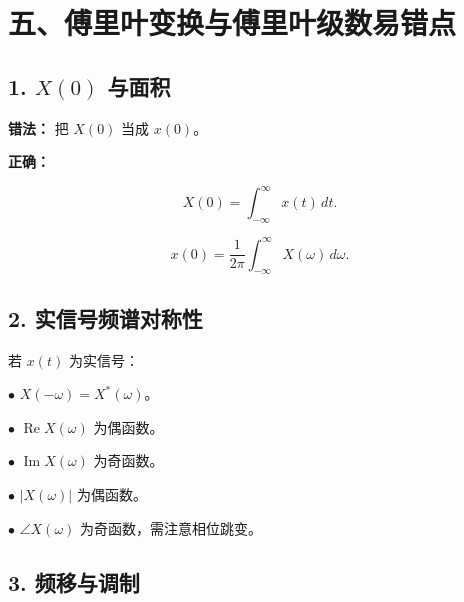 \documentclass[11pt]{ctexart}
\begin{document}
\section*{五、傅里叶变换与傅里叶级数易错点}



\subsection*{1. \(X(0)\) 与面积}



\textbf{错法：} 把 \(X(0)\) 当成 \(x(0)\)。\par



\textbf{正确：}\par

\[

X(0)=\int_{-\infty}^{\infty}x(t)\,dt.

\]

\[

x(0)=\frac{1}{2\pi}\int_{-\infty}^{\infty}X(\omega)\,d\omega.

\]



\subsection*{2. 实信号频谱对称性}



若 \(x(t)\) 为实信号：\par



\noindent\(\bullet\) \(X(-\omega)=X^*(\omega)\)。\par

\noindent\(\bullet\) \(\operatorname{Re}X(\omega)\) 为偶函数。\par

\noindent\(\bullet\) \(\operatorname{Im}X(\omega)\) 为奇函数。\par

\noindent\(\bullet\) \(|X(\omega)|\) 为偶函数。\par

\noindent\(\bullet\) \(\angle X(\omega)\) 为奇函数，需注意相位跳变。\par



\subsection*{3. 频移与调制}
\end{document}
